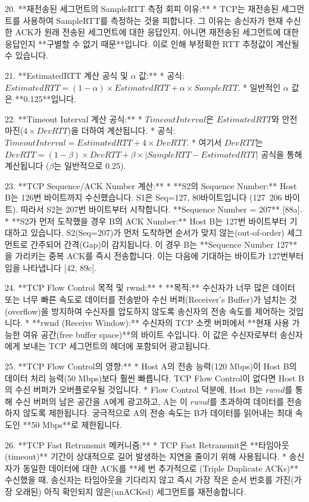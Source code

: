20. **재전송된 세그먼트의 SampleRTT 측정 회피 이유:**
    *   TCP는 재전송된 세그먼트를 사용하여 SampleRTT를 측정하는 것을 피합니다. 그 이유는 송신자가 현재 수신한 ACK가 원래 전송된 세그먼트에 대한 응답인지, 아니면 재전송된 세그먼트에 대한 응답인지 **구별할 수 없기 때문**입니다. 이로 인해 부정확한 RTT 추정값이 계산될 수 있습니다.

21. **EstimatedRTT 계산 공식 및 $\alpha$ 값:**
    *   공식: $EstimatedRTT = (1-\alpha) \times EstimatedRTT + \alpha \times SampleRTT$.
    *   일반적인 $\alpha$ 값은 **0.125**입니다.

22. **Timeout Interval 계산 공식:**
    *   $TimeoutInterval$은 $EstimatedRTT$와 안전 마진($4 \times DevRTT$)을 더하여 계산됩니다.
    *   공식: $TimeoutInterval = EstimatedRTT + 4 \times DevRTT$.
    *   여기서 $DevRTT$는 $DevRTT = (1-\beta) \times DevRTT + \beta \times |SampleRTT-EstimatedRTT|$ 공식을 통해 계산됩니다 ($\beta$는 일반적으로 0.25).

23. **TCP Sequence/ACK Number 계산:**
    *   **S2의 Sequence Number:** Host B는 126번 바이트까지 수신했습니다. S1은 Seq=127, 80바이트입니다 (127~206 바이트). 따라서 S2는 207번 바이트부터 시작합니다. **Sequence Number = 207** [88a].
    *   **S2가 먼저 도착했을 경우 B의 ACK Number:** Host B는 127번 바이트부터 기대하고 있습니다. S2(Seq=207)가 먼저 도착하면 순서가 맞지 않는(out-of-order) 세그먼트로 간주되어 간격(Gap)이 감지됩니다. 이 경우 B는 **Sequence Number 127**을 가리키는 중복 ACK를 즉시 전송합니다. 이는 다음에 기대하는 바이트가 127번부터임을 나타냅니다 [42, 89c].

24. **TCP Flow Control 목적 및 rwnd:**
    *   **목적:** 수신자가 너무 많은 데이터 또는 너무 빠른 속도로 데이터를 전송받아 수신 버퍼(Receiver's Buffer)가 넘치는 것(overflow)을 방지하여 수신자를 압도하지 않도록 송신자의 전송 속도를 제어하는 것입니다.
    *   **rwnd (Receive Window):** 수신자의 TCP 소켓 버퍼에서 **현재 사용 가능한 여유 공간(free buffer space)**의 바이트 수입니다. 이 값은 수신자로부터 송신자에게 보내는 TCP 세그먼트의 헤더에 포함되어 광고됩니다.

25. **TCP Flow Control의 영향:**
    *   Host A의 전송 능력(120 Mbps)이 Host B의 데이터 처리 능력(50 Mbps)보다 훨씬 빠릅니다. TCP Flow Control이 없다면 Host B의 수신 버퍼가 오버플로우될 것입니다.
    *   Flow Control 덕분에, Host B는 $rwnd$를 통해 수신 버퍼의 남은 공간을 A에게 광고하고, A는 이 $rwnd$를 초과하여 데이터를 전송하지 않도록 제한됩니다. 궁극적으로 A의 전송 속도는 B가 데이터를 읽어내는 최대 속도인 **50 Mbps**로 제한됩니다.

26. **TCP Fast Retransmit 메커니즘:**
    *   TCP Fast Retransmit은 **타임아웃(timeout)** 기간이 상대적으로 길어 발생하는 지연을 줄이기 위해 사용됩니다.
    *   송신자가 동일한 데이터에 대한 ACK를 **세 번 추가적으로 (Triple Duplicate ACKs)** 수신했을 때, 송신자는 타임아웃을 기다리지 않고 즉시 가장 작은 순서 번호를 가진(가장 오래된) 아직 확인되지 않은(unACKed) 세그먼트를 재전송합니다.

